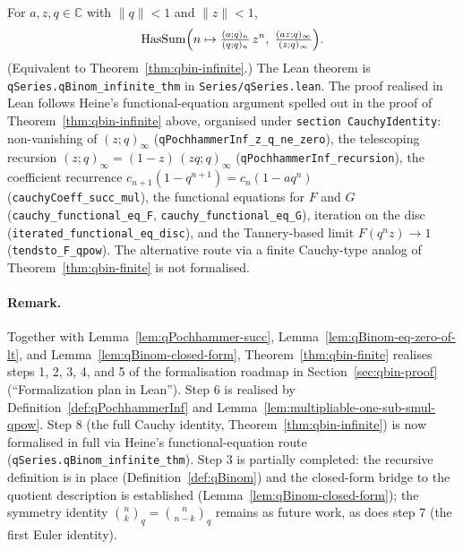 \begin{theorem}\label{thm:qbin-infinite-formalized}\leanok{}
For $a, z, q \in \mathbb{C}$ with $\|q\| < 1$ and $\|z\| < 1$,
\[
  \mathrm{HasSum}\Bigl(n \mapsto \tfrac{(a; q)_n}{(q; q)_n}\, z^n,\;
    \tfrac{(a z; q)_\infty}{(z; q)_\infty}\Bigr).
\]
(Equivalent to Theorem~\ref{thm:qbin-infinite}.)
The Lean theorem is \texttt{qSeries.qBinom\_infinite\_thm} in
\texttt{Series/qSeries.lean}. The proof realised in Lean follows Heine's
functional-equation argument spelled out in the proof of
Theorem~\ref{thm:qbin-infinite} above, organised under
\texttt{section CauchyIdentity}: non-vanishing of $(z;q)_\infty$
(\texttt{qPochhammerInf\_z\_q\_ne\_zero}), the telescoping recursion
$(z;q)_\infty = (1-z)\,(zq;q)_\infty$ (\texttt{qPochhammerInf\_recursion}),
the coefficient recurrence $c_{n+1}(1-q^{n+1}) = c_n(1 - a q^n)$
(\texttt{cauchyCoeff\_succ\_mul}), the functional equations for $F$ and $G$
(\texttt{cauchy\_functional\_eq\_F}, \texttt{cauchy\_functional\_eq\_G}),
iteration on the disc (\texttt{iterated\_functional\_eq\_disc}), and the
Tannery-based limit $F(q^n z) \to 1$ (\texttt{tendsto\_F\_qpow}). The
alternative route via a finite Cauchy-type analog of
Theorem~\ref{thm:qbin-finite} is not formalised.
\end{theorem}

\paragraph{Remark.} Together with Lemma~\ref{lem:qPochhammer-succ},
Lemma~\ref{lem:qBinom-eq-zero-of-lt}, and Lemma~\ref{lem:qBinom-closed-form},
Theorem~\ref{thm:qbin-finite} realises steps 1, 2, 3, 4, and
5 of the formalisation roadmap in Section~\ref{sec:qbin-proof}
(``Formalization plan in Lean''). Step 6 is realised by
Definition~\ref{def:qPochhammerInf} and
Lemma~\ref{lem:multipliable-one-sub-smul-qpow}. Step 8 (the full Cauchy
identity, Theorem~\ref{thm:qbin-infinite}) is now formalised in full
via Heine's functional-equation route (\texttt{qSeries.qBinom\_infinite\_thm}).
Step 3 is partially completed: the recursive definition is in place
(Definition~\ref{def:qBinom}) and the closed-form bridge to the quotient
description is established (Lemma~\ref{lem:qBinom-closed-form}); the
symmetry identity $\binom{n}{k}_q = \binom{n}{n-k}_q$ remains as future
work, as does step 7 (the first Euler identity).
